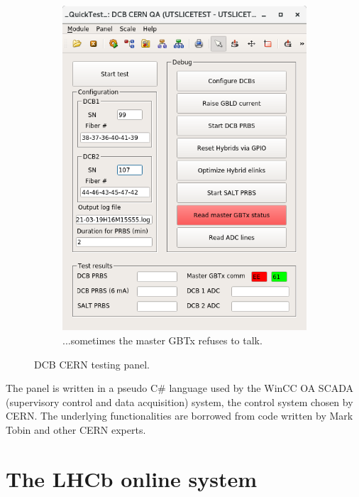 \begin{figure}[!htb]
\begin{subfigure}[t]{0.4\textwidth}
        \includegraphics[width=\textwidth]{./figs-ut-upgrade/dcb/dcb_cern_panel_2.png}
        \caption{
            ...sometimes the master GBTx refuses to talk.
        }
    \end{subfigure}

    \caption{
        DCB CERN testing panel.
    }
    \label{fig:dcb-cern-test-panel}
\end{figure}

The panel is written in a pseudo C\# language used by the WinCC OA
SCADA (supervisory control and data acquisition) system,
the control system chosen by CERN.
The underlying functionalities are borrowed from code written by Mark Tobin
and other CERN experts.


\section{The LHCb online system}
\label{ref:ut:online}

